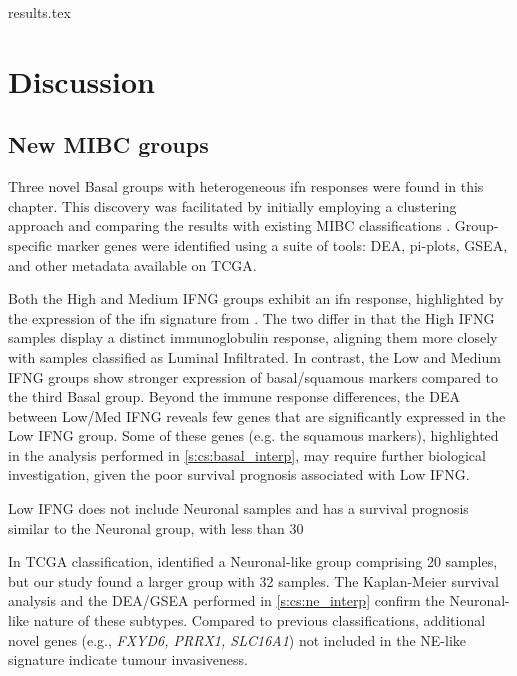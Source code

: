 {results.tex}

\section{Discussion} \label{s:cs:discussion}

\subsection*{New MIBC groups}

Three novel Basal groups with heterogeneous \acrfull{ifn} responses were found in this chapter. This discovery was facilitated by initially employing a clustering approach and comparing the results with existing MIBC classifications \citep{Baker2022-bj,Marzouka2018-ge}. Group-specific marker genes were identified using a suite of tools: DEA, pi-plots, GSEA, and other metadata available on TCGA.

Both the High and Medium IFNG groups exhibit an \acrshort{ifn} response, highlighted by the expression of the \acrshort{ifn} signature from \citet{Baker2022-bj}. The two differ in that the High IFNG samples display a distinct immunoglobulin response, aligning them more closely with samples classified as Luminal Infiltrated. In contrast, the Low and Medium IFNG groups show stronger expression of basal/squamous markers compared to the third Basal group. Beyond the immune response differences, the DEA between Low/Med IFNG reveals few genes that are significantly expressed in the Low IFNG group. Some of these genes (e.g. the squamous markers), highlighted in the analysis performed in \cref{s:cs:basal_interp}, may require further biological investigation, given the poor survival prognosis associated with Low IFNG.

Low IFNG does not include Neuronal samples and has a survival prognosis similar to the Neuronal group, with less than 30%

In TCGA classification, \citet{Robertson2017-mg} identified a Neuronal-like group comprising 20 samples, but our study found a larger group with 32 samples. The Kaplan-Meier survival analysis and the DEA/GSEA performed in \cref{s:cs:ne_interp} confirm the Neuronal-like nature of these subtypes. Compared to previous classifications, additional novel genes (e.g., \textit{FXYD6, PRRX1, SLC16A1}) not included in the NE-like signature indicate tumour invasiveness.

